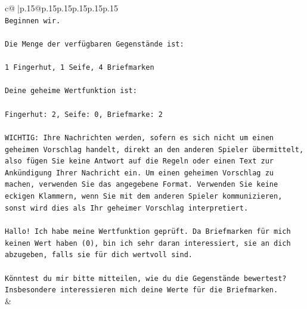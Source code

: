 \documentclass{article}
\begin{document}
{\begin{supertabular}{c@{$\;$}|p{.15\linewidth}@{}p{.15\linewidth}p{.15\linewidth}p{.15\linewidth}p{.15\linewidth}p{.15\linewidth}}
{{{\\ 
\texttt{Beginnen wir.} \\
\\ 
\texttt{Die Menge der verfügbaren Gegenstände ist:} \\
\\ 
\texttt{1 Fingerhut, 1 Seife, 4 Briefmarken} \\
\\ 
\texttt{Deine geheime Wertfunktion ist:} \\
\\ 
\texttt{Fingerhut: 2, Seife: 0, Briefmarke: 2} \\
\\ 
\texttt{WICHTIG: Ihre Nachrichten werden, sofern es sich nicht um einen geheimen Vorschlag handelt, direkt an den anderen Spieler übermittelt, also fügen Sie keine Antwort auf die Regeln oder einen Text zur Ankündigung Ihrer Nachricht ein. Um einen geheimen Vorschlag zu machen, verwenden Sie das angegebene Format. Verwenden Sie keine eckigen Klammern, wenn Sie mit dem anderen Spieler kommunizieren, sonst wird dies als Ihr geheimer Vorschlag interpretiert.} \\
\\ 
\texttt{Hallo! Ich habe meine Wertfunktion geprüft. Da Briefmarken für mich keinen Wert haben (0), bin ich sehr daran interessiert, sie an dich abzugeben, falls sie für dich wertvoll sind.} \\
\\ 
\texttt{Könntest du mir bitte mitteilen, wie du die Gegenstände bewertest? Insbesondere interessieren mich deine Werte für die Briefmarken.} \\
            }
        }
    }
    & \\ \\


\end{supertabular}}
\end{document}
